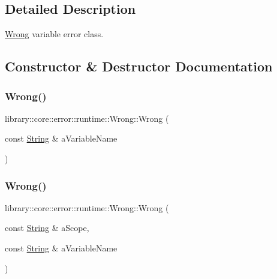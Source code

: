 \subsection{Detailed Description}
\hyperlink{classlibrary_1_1core_1_1error_1_1runtime_1_1_wrong}{Wrong} variable error class. 

\subsection{Constructor \& Destructor Documentation}
\mbox{\label{classlibrary_1_1core_1_1error_1_1runtime_1_1_wrong_acb341a0822b64bfa2d8cdf7963b24f96}} 
\subsubsection{\texorpdfstring{Wrong()}{Wrong()}\hspace{0.1cm}{\footnotesize\ttfamily [1/2]}}
{\footnotesize\ttfamily library\+::core\+::error\+::runtime\+::\+Wrong\+::\+Wrong (\begin{DoxyParamCaption}\item[{const \hyperlink{classlibrary_1_1core_1_1types_1_1_string}{String} \&}]{a\+Variable\+Name }\end{DoxyParamCaption})}

\mbox{\label{classlibrary_1_1core_1_1error_1_1runtime_1_1_wrong_a413ec4868a4a3283cc0a1dcd2882ad1e}} 
\subsubsection{\texorpdfstring{Wrong()}{Wrong()}\hspace{0.1cm}{\footnotesize\ttfamily [2/2]}}
{\footnotesize\ttfamily library\+::core\+::error\+::runtime\+::\+Wrong\+::\+Wrong (\begin{DoxyParamCaption}\item[{const \hyperlink{classlibrary_1_1core_1_1types_1_1_string}{String} \&}]{a\+Scope,  }\item[{const \hyperlink{classlibrary_1_1core_1_1types_1_1_string}{String} \&}]{a\+Variable\+Name }\end{DoxyParamCaption})}

